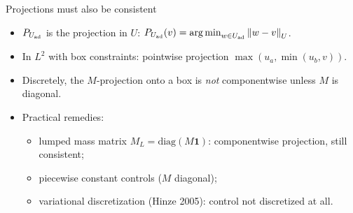 \documentclass[main.tex]{subfiles}
\begin{document}
\begin{frame}{Projections must also be consistent}
  \begin{itemize}
    \item $P_{U_{\mathrm{ad}}}$ is the projection in $U$: $P_{U_{\mathrm{ad}}}(v) = \operatorname*{arg\,min}_{w \in U_{\mathrm{ad}}}\left\lVert w - v \right\rVert_U$.
    \item In $L^2$ with box constraints: pointwise projection $\max(u_a,\min(u_b,v))$.
    \item Discretely, the $M$-projection onto a box is \emph{not} componentwise unless $M$ is diagonal.
    \item Practical remedies:
      \begin{itemize}
        \item lumped mass matrix $M_L = \mathrm{diag}(M\mathbf{1})$: componentwise projection, still consistent;
        \item piecewise constant controls ($M$ diagonal);
        \item variational discretization (Hinze 2005): control not discretized at all.
      \end{itemize}
  \end{itemize}
\end{frame}
\end{document}
